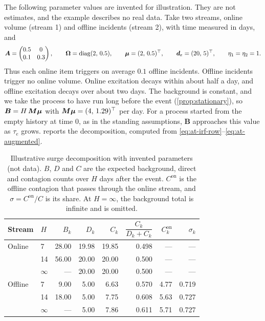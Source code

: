 The following parameter values are invented for illustration. They are not estimates,
and the example describes no real data. Take two streams, online volume (stream 1) and
offline incidents (stream 2), with time measured in days, and
\[
\bm{A}=\begin{pmatrix}0.5&0\\0.1&0.3\end{pmatrix},\qquad
\bm\Omega=\operatorname{diag}(2,\,0.5),\qquad
\bm\mu=(2,\,0.5)^{\top},\qquad
\bm d_e=(20,\,5)^{\top},\qquad \eta_1=\eta_2=1 .
\]
Thus each online item triggers on average $0.1$ offline incidents. Offline incidents
trigger no online volume. Online excitation decays within about half a day, and
offline excitation decays over about two days. The background is constant, and we
take the process to have run long before the event (\cref{prop:stationary}), so
$\bm B=H\,\bm{M}\bm\mu$ with $\bm{M}\bm\mu=(4,\,1.29)^{\top}$ per day. For a process
started from the empty history at time $0$, as in the standing assumptions, $\bm B$
approaches this value as $\tau_e$ grows.
 reports the decomposition, computed from
\eqref{eq:at-irf-row}--\eqref{eq:at-augmented}.

\begin{table}[!htbp]
\centering
\caption{Illustrative surge decomposition with invented parameters (not data). $B$,
$D$ and $C$ are the expected background, direct and contagion counts over $H$ days
after the event. $C^{\mathrm{on}}$ is the offline contagion that passes through the
online stream, and $\sigma=C^{\mathrm{on}}/C$ is its share. At $H=\infty$, the
background total is infinite and is omitted.}
\label{tab:at-illus}
\small
\begin{tabular}{llrrrrrr}
\toprule
Stream & $H$ & $B_k$ & $D_k$ & $C_k$ & $\dfrac{C_k}{D_k+C_k}$ & $C^{\mathrm{on}}_k$ & $\sigma_k$\\
\midrule
Online  & 7        & 28.00 & 19.98 & 19.85 & 0.498 & ---  & ---   \\
        & 14       & 56.00 & 20.00 & 20.00 & 0.500 & ---  & ---   \\
        & $\infty$ & ---   & 20.00 & 20.00 & 0.500 & ---  & ---   \\
\addlinespace
Offline & 7        &  9.00 &  5.00 &  6.63 & 0.570 & 4.77 & 0.719 \\
        & 14       & 18.00 &  5.00 &  7.75 & 0.608 & 5.63 & 0.727 \\
        & $\infty$ & ---   &  5.00 &  7.86 & 0.611 & 5.71 & 0.727 \\
\bottomrule
\end{tabular}
\end{table}


